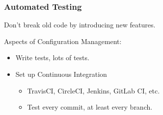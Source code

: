 \begin{frame}

\frametitle{Automated Testing}

\vspace{\fill}

\begin{center}

Don't break old code by introducing new features.

\end{center}

\vspace{\fill}

\footnotesize

Aspects of Configuration Management:

\begin{itemize}

\item Write tests, lots of tests.

\item Set up Continuous Integration

\footnotesize

\begin{itemize}

\item TravisCI, CircleCI, Jenkins, GitLab CI, etc.

\item Test every commit, at least every branch.

\end{itemize}

\end{itemize}

\end{frame}
